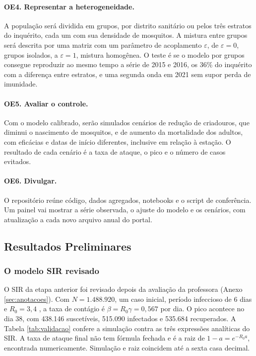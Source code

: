 \paragraph{OE4. Representar a heterogeneidade.} A população será dividida em grupos, por distrito sanitário
ou pelos três estratos do inquérito, cada um com sua densidade de mosquitos. A mistura entre grupos será
descrita por uma matriz com um parâmetro de acoplamento $\varepsilon$, de $\varepsilon = 0$, grupos
isolados, a $\varepsilon = 1$, mistura homogênea. O teste é se o modelo por grupos consegue reproduzir ao
mesmo tempo a série de 2015 e 2016, os 36\% do inquérito com a diferença entre estratos, e uma segunda onda
em 2021 sem supor perda de imunidade.

\paragraph{OE5. Avaliar o controle.} Com o modelo calibrado, serão simulados cenários de redução de
criadouros, que diminui o nascimento de mosquitos, e de aumento da mortalidade dos adultos, com eficácias
e datas de início diferentes, inclusive em relação à estação. O resultado de cada cenário é a taxa de
ataque, o pico e o número de casos evitados.

\paragraph{OE6. Divulgar.} O repositório reúne código, dados agregados, notebooks e o script de
conferência. Um painel vai mostrar a série observada, o ajuste do modelo e os cenários, com atualização a
cada novo arquivo anual do portal.

\subsection{Resultados Preliminares}
\label{sec:preliminares}

\subsubsection{O modelo SIR revisado}

O SIR da etapa anterior foi revisado depois da avaliação da professora (Anexo \ref{sec:anotacoes}). Com
$N = 1.488.920$, um caso inicial, período infeccioso de 6 dias \cite{manore2014} e $R_0 = 3{,}4$
\cite{haider2020}, a taxa de contágio é $\beta = R_0 \gamma = 0{,}567$ por dia. O pico acontece no dia 38,
com 438.146 suscetíveis, 515.090 infectados e 535.684 recuperados. A Tabela \ref{tab:validacao} confere a
simulação contra as três expressões analíticas do SIR. A taxa de ataque final não tem fórmula fechada e é
a raiz de $1 - a = e^{-R_0 a}$, encontrada numericamente. Simulação e raiz coincidem até a sexta casa
decimal.

